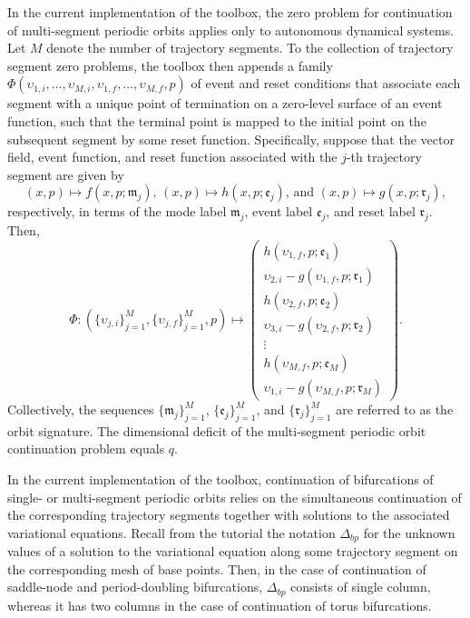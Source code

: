 In the current implementation of the  toolbox, the zero problem for continuation of multi-segment periodic orbits applies only to autonomous dynamical systems. Let $M$ denote the number of trajectory segments. To the collection of  trajectory segment zero problems, the  toolbox then appends a family $\Phi(\upsilon_{1,i},\ldots,\upsilon_{M,i},\upsilon_{1,f},\ldots,\upsilon_{M,f},p)$ of event and reset conditions that associate each segment with a unique point of termination on a zero-level surface of an event function, such that the terminal point is mapped to the initial point on the subsequent segment by some reset function. Specifically, suppose that the vector field, event function, and reset function associated with the $j$-th trajectory segment are given by
\begin{equation}
(x,p)\mapsto f(x,p;\mathfrak{m}_j),\,(x,p)\mapsto h(x,p;\mathfrak{e}_j),\,\mbox{and }(x,p)\mapsto g(x,p;\mathfrak{r}_j),
\end{equation}
respectively, in terms of the mode label $\mathfrak{m}_j$, event label $\mathfrak{e}_j$, and reset label $\mathfrak{r}_j$. Then,
\begin{equation}
\Phi:\left(\{\upsilon_{j,i}\}_{j=1}^M,\{\upsilon_{j,f}\}_{j=1}^M,p\right)\mapsto\left(\begin{array}{c}h(\upsilon_{1,f},p;\mathfrak{e}_1)\\\upsilon_{2,i}-g(\upsilon_{1,f},p;\mathfrak{r}_1)\\h(\upsilon_{2,f},p;\mathfrak{e}_2)\\\upsilon_{3,i}-g(\upsilon_{2,f},p;\mathfrak{r}_2)\\\vdots\\h(\upsilon_{M,f},p;\mathfrak{e}_M)\\\upsilon_{1,i}-g(\upsilon_{M,f},p;\mathfrak{r}_M)\end{array}\right).
\end{equation}
Collectively, the sequences $\{\mathfrak{m}_j\}_{j=1}^M$, $\{\mathfrak{e}_j\}_{j=1}^M$, and $\{\mathfrak{r}_j\}_{j=1}^M$ are referred to as the orbit signature. The dimensional deficit of the multi-segment periodic orbit continuation problem equals $q$.

In the current implementation of the  toolbox, continuation of bifurcations of single- or multi-segment periodic orbits relies on the simultaneous continuation of the corresponding trajectory segments together with solutions to the associated variational equations. Recall from the  tutorial the notation $\Delta_{bp}$ for the unknown values of a solution to the variational equation along some trajectory segment on the corresponding mesh of base points. Then, in the case of continuation of saddle-node and period-doubling bifurcations, $\Delta_{bp}$ consists of single column, whereas it has two columns in the case of continuation of torus bifurcations.

